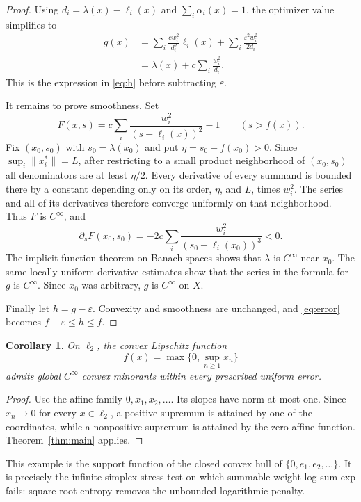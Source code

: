 \documentclass[11pt]{article}
\newtheorem{corollary}[theorem]{Corollary}
\newcommand{\eps}{\varepsilon}
\begin{document}
\begin{proof}
Using $d_i=\lambda(x)-\ell_i(x)$ and
$\sum_i\alpha_i(x)=1$, the optimizer value simplifies to
\begin{align*}
 g(x)
 &=\sum_i\frac{c w_i^2}{d_i^2}\ell_i(x)
   +\sum_i\frac{\eps^2w_i^2}{2d_i}\\
 &=\lambda(x)+c\sum_i\frac{w_i^2}{d_i}.
\end{align*}
This is the expression in \eqref{eq:h} before subtracting $\eps$.

It remains to prove smoothness.  Set
\[
  F(x,s)=c\sum_i\frac{w_i^2}{(s-\ell_i(x))^2}-1
  \qquad (s>f(x)).
\]
Fix $(x_0,s_0)$ with $s_0=\lambda(x_0)$ and put
$\eta=s_0-f(x_0)>0$.  Since $\sup_i\|x_i^*\|=L$, after restricting to a
small product neighborhood of $(x_0,s_0)$ all denominators are at least
$\eta/2$.  Every derivative of every summand is bounded there by a constant
depending only on its order, $\eta$, and $L$, times $w_i^2$.  The series and
all of its derivatives therefore converge uniformly on that neighborhood.
Thus $F$ is $C^\infty$, and
\[
  \partial_sF(x_0,s_0)
  =-2c\sum_i\frac{w_i^2}{(s_0-\ell_i(x_0))^3}<0.
\]
The implicit function theorem on Banach spaces shows that $\lambda$ is
$C^\infty$ near $x_0$.  The same locally uniform derivative estimates show
that the series in the formula for $g$ is $C^\infty$.  Since $x_0$ was
arbitrary, $g$ is $C^\infty$ on $X$.

Finally let $h=g-\eps$.  Convexity and smoothness are unchanged, and
\eqref{eq:error} becomes $f-\eps\leq h\leq f$.
\end{proof}

\begin{corollary}\label{cor:simplex}
On $\ell_2$, the convex Lipschitz function
\[
  f(x)=\max\{0,\sup_{n\geq1}x_n\}
\]
admits global $C^\infty$ convex minorants within every prescribed uniform
error.
\end{corollary}

\begin{proof}
Use the affine family $0,x_1,x_2,\ldots$.  Its slopes have norm at most one.
Since $x_n\to0$ for every $x\in\ell_2$, a positive supremum is attained by
one of the coordinates, while a nonpositive supremum is attained by the
zero affine function.  Theorem~\ref{thm:main} applies.
\end{proof}

This example is the support function of the closed convex hull of
$\{0,e_1,e_2,\ldots\}$.  It is precisely the infinite-simplex stress test on
which summable-weight log-sum-exp fails: square-root entropy removes the
unbounded logarithmic penalty.
\end{document}
